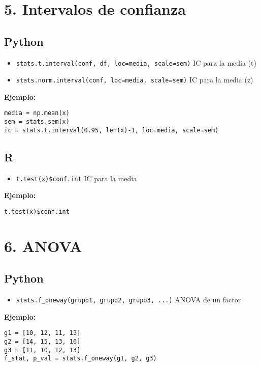 \section*{5. Intervalos de confianza}

\subsection*{Python}
\begin{itemize}
    \item \texttt{stats.t.interval(conf, df, loc=media, scale=sem)} \hfill IC para la media (t)
    \item \texttt{stats.norm.interval(conf, loc=media, scale=sem)} \hfill IC para la media (z)
\end{itemize}

\textbf{Ejemplo:}
\begin{verbatim}
media = np.mean(x)
sem = stats.sem(x)
ic = stats.t.interval(0.95, len(x)-1, loc=media, scale=sem)
\end{verbatim}

\subsection*{R}
\begin{itemize}
    \item \texttt{t.test(x)\$conf.int} \hfill IC para la media
\end{itemize}

\textbf{Ejemplo:}
\begin{verbatim}
t.test(x)$conf.int
\end{verbatim}

\section*{6. ANOVA}

\subsection*{Python}
\begin{itemize}
    \item \texttt{stats.f\_oneway(grupo1, grupo2, grupo3, ...)} \hfill ANOVA de un factor
\end{itemize}

\textbf{Ejemplo:}
\begin{verbatim}
g1 = [10, 12, 11, 13]
g2 = [14, 15, 13, 16]
g3 = [11, 10, 12, 13]
f_stat, p_val = stats.f_oneway(g1, g2, g3)
\end{verbatim}

